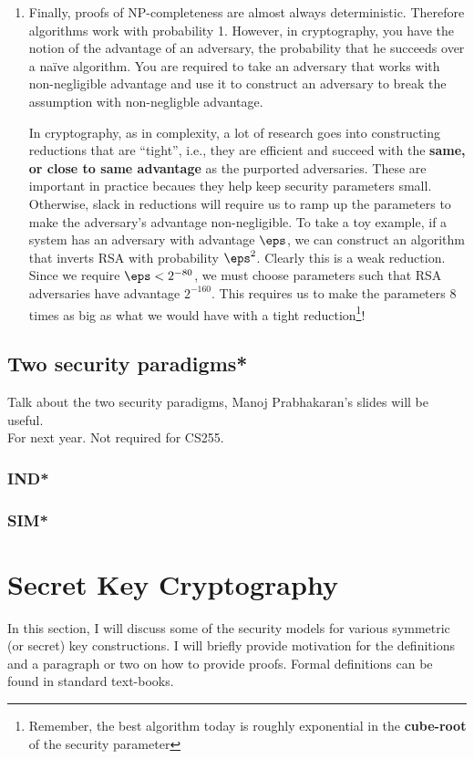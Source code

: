 \documentclass[A4, 11pt]{article}
\newcommand{\todo}[1]{\small{\sc #1}\normalsize}
\begin{document}
\begin{enumerate}
\item Finally, proofs of NP-completeness are almost always deterministic.
Therefore algorithms work with probability 1.  However, in cryptography,
you have the notion of the advantage of an adversary, the probability that
he succeeds over a na\"ive algorithm. You are required to take an adversary
that works with non-negligible advantage and use it to construct an
adversary to break the assumption with non-negligble advantage. 

In cryptography, as in complexity, a lot of research goes into constructing
reductions that are ``tight'', i.e., they are efficient and succeed with
the {\bf same, or close to same advantage} as the purported adversaries.
These are important in practice becaues they help keep security parameters
small. Otherwise, slack in reductions will require us to ramp up the
parameters to make the adversary's advantage non-negligible. To take a toy
example, if a system has an adversary with advantage $\eps$, we can
construct an algorithm that inverts RSA with probability $\eps^2$. Clearly
this is a weak reduction. Since we require $\eps<2^{-80}$, we must choose
parameters such that RSA adversaries have advantage $2^{-160}$. This
requires us to make the parameters 8 times as big as what we would have
with a tight reduction\footnote{Remember, the best algorithm today is
roughly exponential in the {\bf cube-root} of the security parameter}!

\end{enumerate}

\subsection{Two security paradigms*} \label{subsec:indsim}
\todo{Talk about the two security paradigms, Manoj Prabhakaran's slides
will be useful.}
\\

\todo{For next year. Not required for CS255.}

\subsubsection{IND*}
\subsubsection{SIM*}

\section{Secret Key Cryptography}
In this section, I will discuss some of the security models for various
symmetric (or secret) key constructions. I will briefly provide motivation
for the definitions and a paragraph or two on how to provide proofs. Formal
definitions can be found in standard text-books. 
\end{document}
